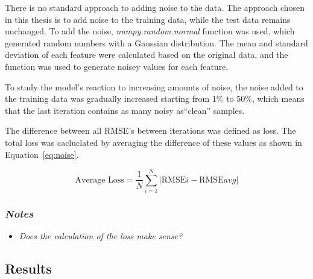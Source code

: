 There is no standard approach to adding noise to the data. The approach
chosen in this thesis
is to add noise to the training data, while the test data remains unchanged.
To add the noise, \textit{numpy.random.normal} function was used, which
generated random numbers
with a Gaussian distribution.
The mean and standard deviation of each feature were calculated based on the
original data, and
the function was used to generate noisey values for each feature.

To study the model's reaction to increasing amounts of noise, the noise added
to the training
data was gradually increased starting from 1\% to 50\%, which means that the
last iteration
contains as many noisy as``clean'' samples.

The difference between all \ac{RMSE}'s between iterations was defined as loss.
The total loss was cacluclated by averaging the difference of these values as
shown in
Equation~\ref{eq:noise}.

\begin{tcolorbox}[arc=0pt,boxrule=0.5pt]
    \begin{equation}
        \text{Average Loss} = \frac{1}{N} \sum_{i=1}^{N} |\text{RMSE}i -
        \text{RMSE}{avg}|\label
        {eq:noise}
    \end{equation}
\end{tcolorbox}

\subsubsection*{\textit{Notes}}

\begin{itemize}
    \item \textit{Does the calculation of the loss make sense?}
\end{itemize}

\subsection{Results}\label{subsec:results-robustness}

